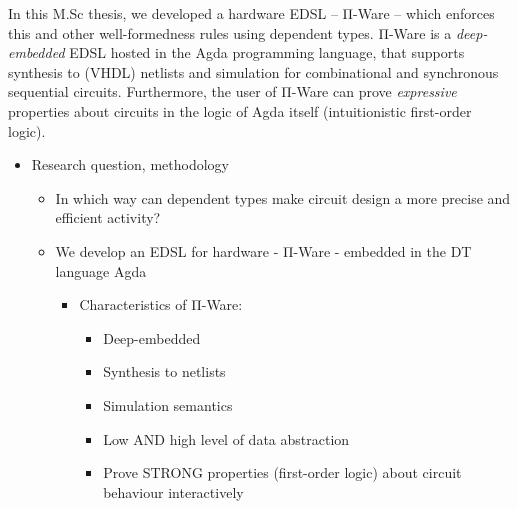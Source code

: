     In this M.Sc thesis, we developed a hardware \ac{EDSL} -- Π-Ware -- which enforces this and other
    well-formedness rules using dependent types.
    Π-Ware is a \emph{deep-embedded} \ac{EDSL} hosted in the Agda programming language,
    that supports synthesis to (\acs{VHDL}) netlists and simulation for combinational and synchronous sequential circuits.
    Furthermore, the user of Π-Ware can prove \emph{expressive} properties about circuits in the logic
    of Agda itself (intuitionistic first-order logic).


    \begin{itemize}
        \item Research question, methodology
        \begin{itemize}
            \item In which way can dependent types make circuit design a more precise and efficient activity?
            \item We develop an EDSL for hardware - Π-Ware - embedded in the DT language Agda
            \begin{itemize}
                \item Characteristics of Π-Ware:
                \begin{itemize}
                    \item Deep-embedded
                    \item Synthesis to netlists
                    \item Simulation semantics
                    \item Low AND high level of data abstraction
                    \item Prove STRONG properties (first-order logic) about circuit behaviour interactively
                \end{itemize}
            \end{itemize}
        \end{itemize}
    \end{itemize}
